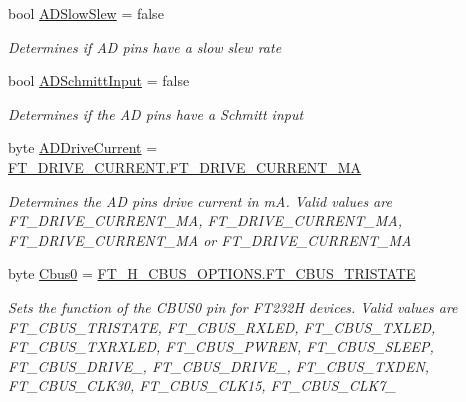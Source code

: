 \begin{DoxyCompactItemize}
bool \mbox{\hyperlink{class_f_t_d2_x_x___n_e_t_1_1_f_t_d_i_1_1_f_t232_h___e_e_p_r_o_m___s_t_r_u_c_t_u_r_e_aee02a76d03dc1513c7832ad5b4d57aca}{A\+D\+Slow\+Slew}} = false
\begin{DoxyCompactList}\small\item\em Determines if AD pins have a slow slew rate \end{DoxyCompactList}\item 
bool \mbox{\hyperlink{class_f_t_d2_x_x___n_e_t_1_1_f_t_d_i_1_1_f_t232_h___e_e_p_r_o_m___s_t_r_u_c_t_u_r_e_a2b26e24397ff60d0ffc76522a07b0eb4}{A\+D\+Schmitt\+Input}} = false
\begin{DoxyCompactList}\small\item\em Determines if the AD pins have a Schmitt input \end{DoxyCompactList}\item 
byte \mbox{\hyperlink{class_f_t_d2_x_x___n_e_t_1_1_f_t_d_i_1_1_f_t232_h___e_e_p_r_o_m___s_t_r_u_c_t_u_r_e_a5d806e423536796b574339af424e3ca5}{A\+D\+Drive\+Current}} = \mbox{\hyperlink{class_f_t_d2_x_x___n_e_t_1_1_f_t_d_i_1_1_f_t___d_r_i_v_e___c_u_r_r_e_n_t_af6b404bcc6f2eb88bbc95b183d5729ea}{F\+T\+\_\+\+D\+R\+I\+V\+E\+\_\+\+C\+U\+R\+R\+E\+N\+T.\+F\+T\+\_\+\+D\+R\+I\+V\+E\+\_\+\+C\+U\+R\+R\+E\+N\+T\+\_\+MA}}
\begin{DoxyCompactList}\small\item\em Determines the AD pins drive current in mA. Valid values are F\+T\+\_\+\+D\+R\+I\+V\+E\+\_\+\+C\+U\+R\+R\+E\+N\+T\+\_\+MA, F\+T\+\_\+\+D\+R\+I\+V\+E\+\_\+\+C\+U\+R\+R\+E\+N\+T\+\_\+MA, F\+T\+\_\+\+D\+R\+I\+V\+E\+\_\+\+C\+U\+R\+R\+E\+N\+T\+\_\+MA or F\+T\+\_\+\+D\+R\+I\+V\+E\+\_\+\+C\+U\+R\+R\+E\+N\+T\+\_\+MA \end{DoxyCompactList}\item 
byte \mbox{\hyperlink{class_f_t_d2_x_x___n_e_t_1_1_f_t_d_i_1_1_f_t232_h___e_e_p_r_o_m___s_t_r_u_c_t_u_r_e_a1314239e298269aabf7aadf6e4dcac96}{Cbus0}} = \mbox{\hyperlink{class_f_t_d2_x_x___n_e_t_1_1_f_t_d_i_1_1_f_t__232_h___c_b_u_s___o_p_t_i_o_n_s_a87f6bc339ec2e6bbb3ad093eb9d38278}{F\+T\+\_\+H\+\_\+\+C\+B\+U\+S\+\_\+\+O\+P\+T\+I\+O\+N\+S.\+F\+T\+\_\+\+C\+B\+U\+S\+\_\+\+T\+R\+I\+S\+T\+A\+TE}}
\begin{DoxyCompactList}\small\item\em Sets the function of the C\+B\+U\+S0 pin for F\+T232H devices. Valid values are F\+T\+\_\+\+C\+B\+U\+S\+\_\+\+T\+R\+I\+S\+T\+A\+TE, F\+T\+\_\+\+C\+B\+U\+S\+\_\+\+R\+X\+L\+ED, F\+T\+\_\+\+C\+B\+U\+S\+\_\+\+T\+X\+L\+ED, F\+T\+\_\+\+C\+B\+U\+S\+\_\+\+T\+X\+R\+X\+L\+ED, F\+T\+\_\+\+C\+B\+U\+S\+\_\+\+P\+W\+R\+EN, F\+T\+\_\+\+C\+B\+U\+S\+\_\+\+S\+L\+E\+EP, F\+T\+\_\+\+C\+B\+U\+S\+\_\+\+D\+R\+I\+V\+E\+\_, F\+T\+\_\+\+C\+B\+U\+S\+\_\+\+D\+R\+I\+V\+E\+\_, F\+T\+\_\+\+C\+B\+U\+S\+\_\+\+T\+X\+D\+EN, F\+T\+\_\+\+C\+B\+U\+S\+\_\+\+C\+L\+K30, F\+T\+\_\+\+C\+B\+U\+S\+\_\+\+C\+L\+K15, F\+T\+\_\+\+C\+B\+U\+S\+\_\+\+C\+L\+K7\+\_ \end{DoxyCompactList}\item 

\end{DoxyCompactItemize}
